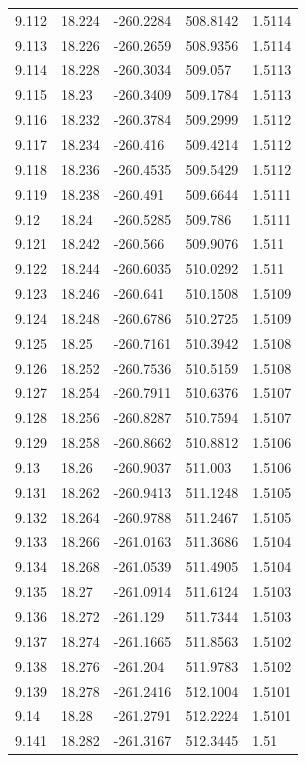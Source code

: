 \begin{tabular}{lllll}
9.112 & 18.224 & -260.2284 & 508.8142 & 1.5114 \\
9.113 & 18.226 & -260.2659 & 508.9356 & 1.5114 \\
9.114 & 18.228 & -260.3034 & 509.057 & 1.5113 \\
9.115 & 18.23 & -260.3409 & 509.1784 & 1.5113 \\
9.116 & 18.232 & -260.3784 & 509.2999 & 1.5112 \\
9.117 & 18.234 & -260.416 & 509.4214 & 1.5112 \\
9.118 & 18.236 & -260.4535 & 509.5429 & 1.5112 \\
9.119 & 18.238 & -260.491 & 509.6644 & 1.5111 \\
9.12 & 18.24 & -260.5285 & 509.786 & 1.5111 \\
9.121 & 18.242 & -260.566 & 509.9076 & 1.511 \\
9.122 & 18.244 & -260.6035 & 510.0292 & 1.511 \\
9.123 & 18.246 & -260.641 & 510.1508 & 1.5109 \\
9.124 & 18.248 & -260.6786 & 510.2725 & 1.5109 \\
9.125 & 18.25 & -260.7161 & 510.3942 & 1.5108 \\
9.126 & 18.252 & -260.7536 & 510.5159 & 1.5108 \\
9.127 & 18.254 & -260.7911 & 510.6376 & 1.5107 \\
9.128 & 18.256 & -260.8287 & 510.7594 & 1.5107 \\
9.129 & 18.258 & -260.8662 & 510.8812 & 1.5106 \\
9.13 & 18.26 & -260.9037 & 511.003 & 1.5106 \\
9.131 & 18.262 & -260.9413 & 511.1248 & 1.5105 \\
9.132 & 18.264 & -260.9788 & 511.2467 & 1.5105 \\
9.133 & 18.266 & -261.0163 & 511.3686 & 1.5104 \\
9.134 & 18.268 & -261.0539 & 511.4905 & 1.5104 \\
9.135 & 18.27 & -261.0914 & 511.6124 & 1.5103 \\
9.136 & 18.272 & -261.129 & 511.7344 & 1.5103 \\
9.137 & 18.274 & -261.1665 & 511.8563 & 1.5102 \\
9.138 & 18.276 & -261.204 & 511.9783 & 1.5102 \\
9.139 & 18.278 & -261.2416 & 512.1004 & 1.5101 \\
9.14 & 18.28 & -261.2791 & 512.2224 & 1.5101 \\
9.141 & 18.282 & -261.3167 & 512.3445 & 1.51 \\

\end{tabular}
